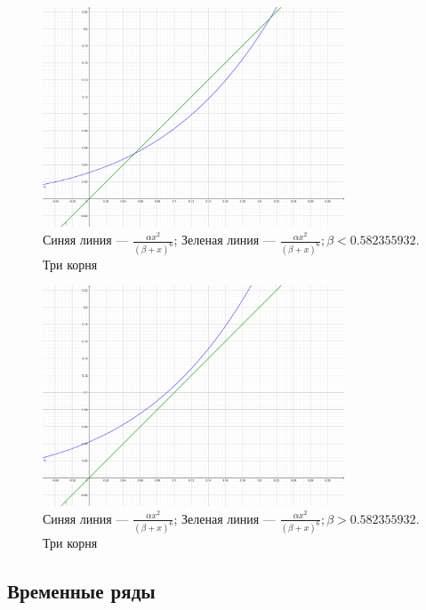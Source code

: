         \begin{figure}[h!]
            \centering
            \includegraphics[width=0.8\textwidth]{images/main_intersect.jpg}

            \caption{Синяя линия --- \(\frac{\alpha x^2}{(\beta + x)^6}\); Зеленая линия --- \(\frac{\alpha x^2}{(\beta + x)^6}; \beta < 0.582355932\). Три корня}
            \label{mainIntersect}
        \end{figure}

        \begin{figure}[h!]
            \centering
            \includegraphics[width=0.8\textwidth]{images/main_over.jpg}

            \caption{Синяя линия --- \(\frac{\alpha x^2}{(\beta + x)^6}\); Зеленая линия --- \(\frac{\alpha x^2}{(\beta + x)^6}; \beta > 0.582355932\). Три корня}
            \label{mainOver}
        \end{figure}

    \subsection{Временные ряды}
    
